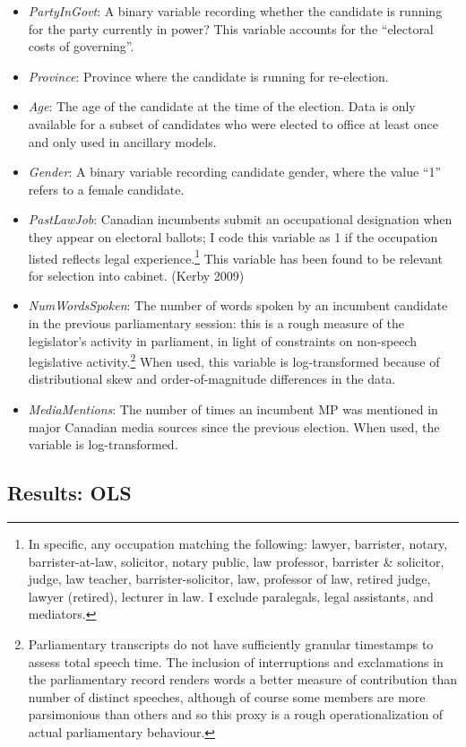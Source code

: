 \documentclass[letter,12pt]{article}
\begin{document}
\begin{itemize}
\item \textit{PartyInGovt}: A binary variable recording whether the candidate is running for the party currently in power? This variable accounts for the ``electoral costs of governing''.
\item \textit{Province}: Province where the candidate is running for re-election.
\item \textit{Age}: The age of the candidate at the time of the election. Data is only available for a subset of candidates who were elected to office at least once and only used in ancillary models.
\item \textit{Gender}: A binary variable recording candidate gender, where the value ``1'' refers to a female candidate.
\item \textit{PastLawJob}: Canadian incumbents submit an occupational designation when they appear on electoral ballots; I code this variable as 1 if the occupation listed reflects legal experience.\footnote{In specific, any occupation matching the following: lawyer, barrister, notary, barrister-at-law, solicitor, notary public, law professor, barrister \& solicitor, judge, law teacher, barrister-solicitor, law, professor of law, retired judge, lawyer (retired), lecturer in law. I exclude paralegals, legal assistants, and mediators.} This variable has been found to be relevant for selection into cabinet. (Kerby 2009)
\item \textit{NumWordsSpoken}: The number of words spoken by an incumbent candidate in the previous parliamentary session: this is a rough measure of the legislator's activity in parliament, in light of constraints on non-speech legislative activity.\footnote{Parliamentary transcripts do not have sufficiently granular timestamps to assess total speech time. The inclusion of interruptions and exclamations in the parliamentary record renders words a better measure of contribution than number of distinct speeches, although of course some members are more parsimonious than others and so this proxy is a rough operationalization of actual parliamentary behaviour.} When used, this variable is log-transformed because of distributional skew and order-of-magnitude differences in the data.
\item \textit{MediaMentions}: The number of times an incumbent MP was mentioned in major Canadian media sources since the previous election. When used, the variable is log-transformed.
\end{itemize}

\subsection*{Results: OLS}
\end{document}
